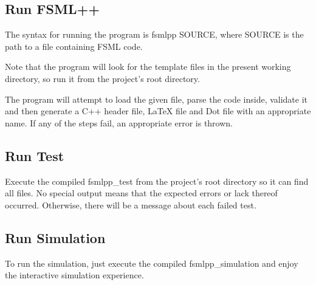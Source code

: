 \subsection*{Run F\-S\-M\-L++ }

The syntax for running the program is {\ttfamily fsmlpp S\-O\-U\-R\-C\-E}, where S\-O\-U\-R\-C\-E is the path to a file containing F\-S\-M\-L code.

Note that the program will look for the template files in the present working directory, so run it from the project's root directory.

The program will attempt to load the given file, parse the code inside, validate it and then generate a C++ header file, La\-Te\-X file and Dot file with an appropriate name. If any of the steps fail, an appropriate error is thrown.

\subsection*{Run Test }

Execute the compiled {\ttfamily fsmlpp\-\_\-test} from the project's root directory so it can find all files. No special output means that the expected errors or lack thereof occurred. Otherwise, there will be a message about each failed test.

\subsection*{Run Simulation }

To run the simulation, just execute the compiled {\ttfamily fsmlpp\-\_\-simulation} and enjoy the interactive simulation experience. 